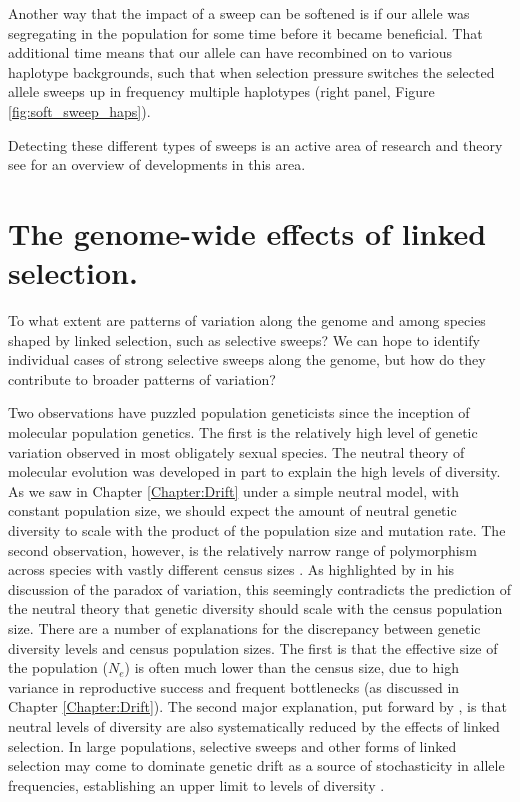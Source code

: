 Another way that the impact of a sweep can be softened is if our
allele was segregating in the population for some time before it
became beneficial. That additional time means that our allele can have
recombined on to various haplotype backgrounds, such that when
selection pressure switches the selected allele sweeps up in frequency
multiple haplotypes (right panel, Figure \ref{fig:soft_sweep_haps}). 

Detecting these different types of sweeps is an active area of
research and theory see \citet{hermisson2017soft} for an overview of
developments in this area.









\section{The genome-wide effects of linked selection.}

To what extent are patterns of variation along the genome and
  among species shaped by linked selection, such as selective sweeps? 
We can hope to identify individual cases of strong selective sweeps
along the genome, but how do they contribute to broader patterns of
variation?

 Two observations have puzzled population geneticists since the
inception of molecular population genetics. The first is the relatively high
level of genetic variation observed in most obligately sexual species.  
The neutral theory of molecular evolution was developed in part to
explain the high levels of diversity. As we saw in Chapter \ref{Chapter:Drift} 
under a simple neutral model, with constant population size, we should expect the amount of neutral genetic
diversity to scale with the product of the population size and
mutation rate. The second observation, however, is the relatively narrow range 
of polymorphism across species with vastly different census sizes \citep[see ][ for a recent review]{Leffler:12}. 
As highlighted by \citet{Lewontin:74} in his discussion of the paradox
of variation, this seemingly contradicts the prediction of the neutral theory that
genetic diversity should scale with the census population size. There are a number of explanations for the discrepancy between genetic
diversity levels and census population sizes. The first is that the effective size of the population ($N_e$) is
often much lower than the census size, due to high variance in
reproductive success and frequent bottlenecks (as discussed in  Chapter \ref{Chapter:Drift}). 
The second major explanation, put forward by \citet{MaynardSmith:74},
is that neutral levels of diversity are also systematically reduced by the effects of linked selection. 
In large populations, selective sweeps and other forms of linked selection may come to dominate genetic drift as a
source of stochasticity in allele frequencies, establishing an upper limit to levels of diversity \citep{Kaplan:89, Gillespie:00}. 


